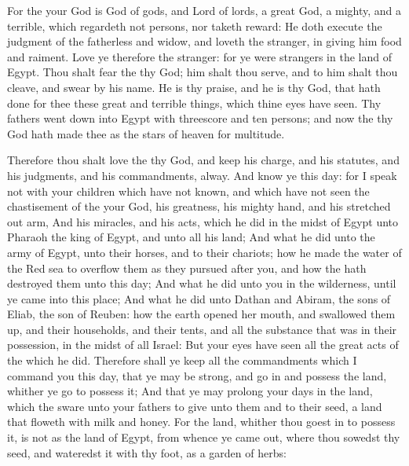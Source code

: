 \begin{biblechapter}
\verse For the \LORD your God is God of gods, and Lord of lords, a great God, a mighty, and a terrible, which regardeth not persons, nor taketh reward:
\verse He doth execute the judgment of the fatherless and widow, and loveth the stranger, in giving him food and raiment.
\verse Love ye therefore the stranger: for ye were strangers in the land of Egypt.
\verse Thou shalt fear the \LORD thy God; him shalt thou serve, and to him shalt thou cleave, and swear by his name.
\verse He is thy praise, and he is thy God, that hath done for thee these great and terrible things, which thine eyes have seen.
\verse Thy fathers went down into Egypt with threescore and ten persons; and now the \LORD thy God hath made thee as the stars of heaven for multitude.
\end{biblechapter}

\begin{biblechapter} %
 Therefore thou shalt love the \LORD thy God, and keep his charge, and his statutes, and his judgments, and his commandments, alway.
\verse And know ye this day: for I speak not with your children which have not known, and which have not seen the chastisement of the \LORD your God, his greatness, his mighty hand, and his stretched out arm,
\verse And his miracles, and his acts, which he did in the midst of Egypt unto Pharaoh the king of Egypt, and unto all his land;
\verse And what he did unto the army of Egypt, unto their horses, and to their chariots; how he made the water of the Red sea to overflow them as they pursued after you, and how the \LORD hath destroyed them unto this day;
\verse And what he did unto you in the wilderness, until ye came into this place;
\verse And what he did unto Dathan and Abiram, the sons of Eliab, the son of Reuben: how the earth opened her mouth, and swallowed them up, and their households, and their tents, and all the substance that was in their possession, in the midst of all Israel:
\verse But your eyes have seen all the great acts of the \LORD which he did.
\verse Therefore shall ye keep all the commandments which I command you this day, that ye may be strong, and go in and possess the land, whither ye go to possess it;
\verse And that ye may prolong your days in the land, which the \LORD sware unto your fathers to give unto them and to their seed, a land that floweth with milk and honey.
\verse For the land, whither thou goest in to possess it, is not as the land of Egypt, from whence ye came out, where thou sowedst thy seed, and wateredst it with thy foot, as a garden of herbs:

\end{biblechapter}
